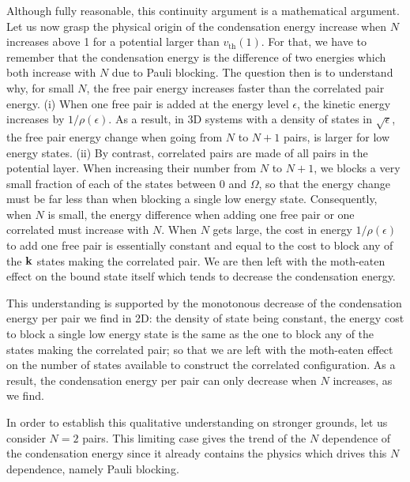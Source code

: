 \documentclass[aps,prb,showpacs,3p,twocolumn]{elsarticle}
\begin{document}
Although fully reasonable, this continuity argument is a mathematical argument. Let us now grasp the physical origin of the condensation energy increase when $N$ increases above 1 for a potential larger than $v_{\text{th}}(1)$.  For that, we have to remember that the condensation energy is the difference of two energies which both increase with $N$ due to Pauli blocking.  The question then is to understand why, for small $N$, the free pair energy increases faster than the correlated pair energy.  (i) When one free pair is added at the energy level $\epsilon$, the kinetic energy increases by $1/\rho(\epsilon)$.  As a result, in 3D systems with a density of states in $\sqrt{\epsilon}$, the free pair energy change when going from $N$ to $N+1$ pairs, is  larger for low energy states.  (ii) By contrast, correlated pairs are made of all pairs in the potential layer. When increasing their number from $N$ to $N+1$, we blocks a very small fraction of each of the states between $0$ and $\Omega$, so that the energy change must be far less than when blocking a single low energy state.  Consequently, when $N$ is small,  the energy difference when adding one free pair or one correlated must increase with $N$. When $N$ gets large, the cost in energy $1/\rho(\epsilon)$ to add one free pair is essentially constant and equal to the cost to block any of the $\mathbf{k}$ states making the correlated pair.  We are then left with the moth-eaten effect on the bound state itself which tends to decrease the condensation energy. 

This understanding is supported by the monotonous decrease of the condensation energy per pair we find in 2D: the density of state being constant, the energy cost to block a single low energy state is the same as the one to block  any of the states making the correlated pair; so that we are left with the moth-eaten effect on the number of states available to construct the correlated configuration.  As a result, the condensation energy per pair can only decrease when $N$ increases, as we find.  

In order to establish this qualitative understanding on stronger  grounds, let us consider $N=2$ pairs. This limiting case gives the trend of the $N$ dependence of the condensation energy since it already contains the physics which drives this $N$ dependence, namely Pauli blocking.  
\end{document}
